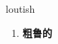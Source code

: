 
\begin{frame}
{\huge loutish}
\begin{center}
\begin{enumerate}\Large
  \item \textbf{粗鲁的}
\end{enumerate}
\end{center}
\end{frame}
